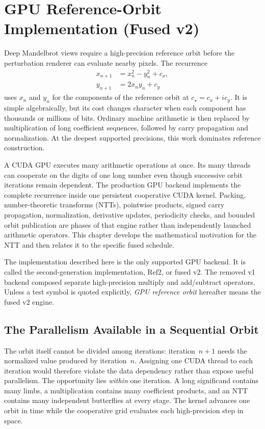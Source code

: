 \section{GPU Reference-Orbit Implementation (Fused v2)}
\label{subsec:ref-orbit-gpu}

Deep Mandelbrot views require a high-precision reference orbit before the
perturbation renderer can evaluate nearby pixels.  The recurrence
\begin{align}
  x_{n+1} &= x_n^2-y_n^2+c_x, \\
  y_{n+1} &= 2x_ny_n+c_y
  \label{eq:gpu-reference-components}
\end{align}
uses $x_n$ and $y_n$ for the components of the reference orbit at
$c_\star=c_x+i c_y$.
It is simple algebraically, but its cost changes character when each component has
thousands or millions of bits.  Ordinary machine arithmetic is then replaced
by multiplication of long coefficient sequences, followed by carry
propagation and normalization.  At the deepest supported precisions, this work
dominates reference construction.

A CUDA GPU executes many arithmetic operations at once.  Its many threads can
cooperate on the digits of one long number even though successive orbit
iterations remain dependent.  The production GPU backend implements the complete recurrence inside one
persistent cooperative CUDA kernel.  Packing, number-theoretic transforms
(NTTs), pointwise products, signed carry propagation, normalization, derivative
updates, periodicity checks, and bounded orbit publication are phases of that
engine rather than independently launched arithmetic operators.  This chapter
develops the mathematical motivation for the NTT and then relates it to the
specific fused schedule.

The implementation described here is the only supported GPU backend.  It is
called the second-generation implementation, Ref2, or fused v2.  The removed v1
backend composed separate high-precision multiply and add/subtract operators.
Unless a test symbol is quoted explicitly, \emph{GPU reference orbit} hereafter
means the fused v2 engine.

\subsection{The Parallelism Available in a Sequential Orbit}
\label{subsec:gpu-reference-parallelism}

The orbit itself cannot be divided among iterations: iteration~$n+1$ needs the
normalized value produced by iteration~$n$.  Assigning one CUDA thread to each
iteration would therefore violate the data dependency rather than expose useful
parallelism.  The opportunity lies \emph{within} one iteration.  A long
significand contains many limbs, a multiplication contains many coefficient
products, and an NTT contains many independent butterflies at every stage.
The kernel advances one orbit in time while the cooperative grid evaluates each
high-precision step in space.

